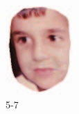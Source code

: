 \begin{figure}[t]
\begin{subfigure}[t]{0.2\textwidth}
		\includegraphics[width=\textwidth]{ilaware_cover2.png}
		\caption{5-7}
	\end{subfigure}
	\begin{subfigure}[t]{0.2\textwidth}

\end{subfigure}
\end{figure}
